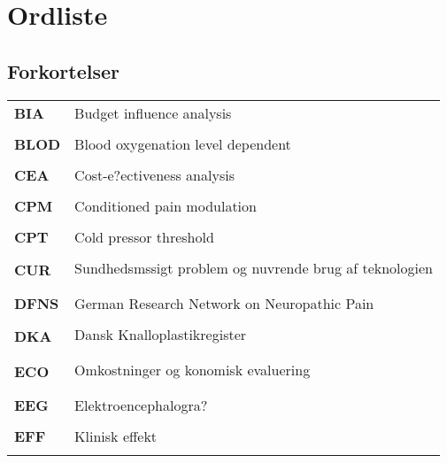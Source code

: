 \chapter*{Ordliste} \label{ordliste}
\vspace{-.75cm}
\section*{Forkortelser}
\vspace{0.75cm}
\begin{longtable}{p{}  p{}}

\textbf{BIA} & Budget influence analysis                                
\\ \\
\textbf{BLOD}& Blood oxygenation level dependent                        
\\ \\
\textbf{CEA} & Cost-e?ectiveness analysis                               
\\ \\
\textbf{CPM} & Conditioned pain modulation                              
\\ \\
\textbf{CPT} & Cold pressor threshold                                   
\\ \\
\textbf{CUR} & Sundhedsmssigt problem og nuvrende brug af teknologien 
\\ \\
\textbf{DFNS}& German Research Network on Neuropathic Pain              
\\ \\
\textbf{DKA} & Dansk Knalloplastikregister                             
\\ \\
\textbf{ECO} & Omkostninger og konomisk evaluering                     
\\ \\
\textbf{EEG} & Elektroencephalogra?                                     
\\ \\
\textbf{EFF} & Klinisk effekt                                           
\\ \\

\end{longtable}

